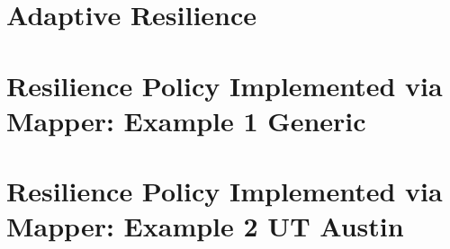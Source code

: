 
\section{Adaptive Resilience}
\section{Resilience Policy Implemented via Mapper: Example 1 Generic}
\section{Resilience Policy Implemented via Mapper: Example 2 UT Austin}

